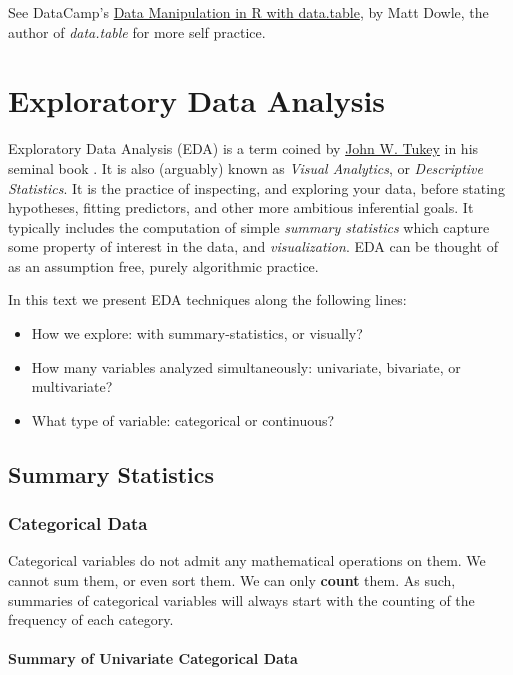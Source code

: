 \documentclass[]{book}
\providecommand{\tightlist}{%
  \setlength{\itemsep}{0pt}\setlength{\parskip}{0pt}}
\theoremstyle{definition}
\theoremstyle{definition}
\theoremstyle{definition}
\theoremstyle{remark}
\begin{document}
See DataCamp's
\href{https://www.datacamp.com/courses/data-manipulation-in-r-with-datatable}{Data
Manipulation in R with data.table}, by Matt Dowle, the author of
\emph{data.table} for more self practice.

\chapter{Exploratory Data Analysis}\label{eda}

Exploratory Data Analysis (EDA) is a term coined by
\href{https://en.wikipedia.org/wiki/John_Tukey}{John W. Tukey} in his
seminal book \citep{tukey1977exploratory}. It is also (arguably) known
as \emph{Visual Analytics}, or \emph{Descriptive Statistics}. It is the
practice of inspecting, and exploring your data, before stating
hypotheses, fitting predictors, and other more ambitious inferential
goals. It typically includes the computation of simple \emph{summary
statistics} which capture some property of interest in the data, and
\emph{visualization}. EDA can be thought of as an assumption free,
purely algorithmic practice.

In this text we present EDA techniques along the following lines:

\begin{itemize}
\tightlist
\item
  How we explore: with summary-statistics, or visually?
\item
  How many variables analyzed simultaneously: univariate, bivariate, or
  multivariate?
\item
  What type of variable: categorical or continuous?
\end{itemize}

\section{Summary Statistics}\label{summary-statistics}

\subsection{Categorical Data}\label{categorical-data}

Categorical variables do not admit any mathematical operations on them.
We cannot sum them, or even sort them. We can only \textbf{count} them.
As such, summaries of categorical variables will always start with the
counting of the frequency of each category.

\subsubsection{Summary of Univariate Categorical
Data}\label{summary-of-univariate-categorical-data}
\end{document}
